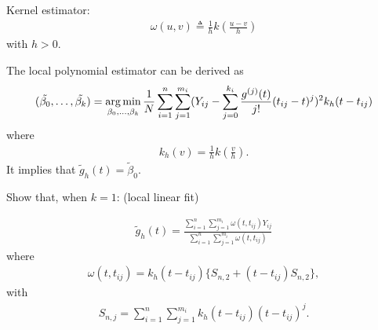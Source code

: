 \documentclass[UTF8,a4paper,10pt]{article}
\begin{document}
\begin{mybox}{}
  Kernel estimator: 
  \begin{equation*}
    \begin{aligned}
      \omega(u,v)\triangleq \frac{1}{h}k(\frac{u-v}{h})
    \end{aligned}
  \end{equation*}
  with \(h>0\).
  


\end{mybox}




  \begin{Problem}[]{}

    The local polynomial estimator can be derived as 
    \begin{equation*}
      \begin{aligned}
        (\tilde{\beta_0},\ldots,\tilde{\beta_k}) = \operatorname*{arg\,min}_{\beta_0,\ldots,\beta_k} \frac{1}{N}\sum_{i=1}^{n}\sum_{j=1}^{m_i} (Y_{ij}-\sum_{j=0}^{k_i}\frac{g^{(j)}(t)}{j!}(t_{ij}-t)^{j})^2k_{h}(t-t_{ij}) 
      \end{aligned}
    \end{equation*}
    where
    \begin{equation*}
      \begin{aligned}
        k_{h}(v) = \frac{1}{h}k(\frac{v}{h}).
      \end{aligned}
    \end{equation*}
    It implies that \(\tilde{g}_h(t) = \tilde{\beta}_0\).

    Show that, when \(k=1\): (local linear fit)

    \begin{equation*}
      \begin{aligned}
        \tilde{g}_h(t) = \frac{\sum_{i=1}^{n}\sum_{j=1}^{m_i}\omega(t,t_{ij})Y_{ij}}{\sum_{i=1}^{n}\sum_{j=1}^{m_i}\omega(t,t_{ij})}
      \end{aligned}
    \end{equation*}
    where
    \begin{equation*}
      \begin{aligned}
        \omega(t,t_{ij}) = k_h(t-t_{ij})\{S_{n,2}+(t-t_{ij})S_{n,2}\},
      \end{aligned}
    \end{equation*}
    with
    \begin{equation*}
      \begin{aligned}
        S_{n,j} = \sum_{i=1}^{n}\sum_{j=1}^{m_i} k_h(t-t_{ij})(t-t_{ij})^j.
      \end{aligned}
    \end{equation*}
  \end{Problem}
\end{document}
